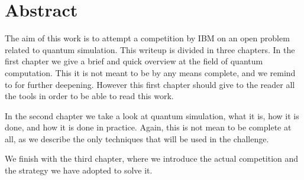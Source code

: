 \chapter{Abstract}
The aim of this work is to attempt a competition by IBM on an open problem related to quantum simulation.
This writeup is divided in three chapters. In the first chapter we give a brief and quick overview at the field of quantum computation. This it is not meant to be by any means complete, and we remind to \cite{NielsenChuang} for further deepening. However this first chapter should give to the reader all the tools in order to be able to read this work.

In the second chapter we take a look at quantum simulation, what it is, how it is done, and how it is done in practice. Again, this is not mean to be complete at all, as we describe the only techniques that will be used in the challenge.

We finish with the third chapter, where we introduce the actual competition and the strategy we have adopted to solve it.